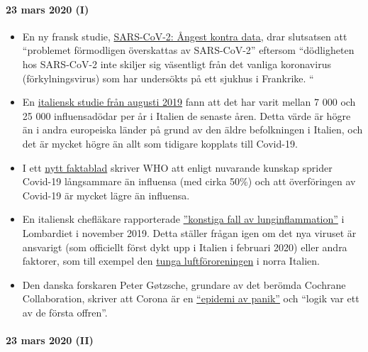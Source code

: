 \hypertarget{23-mars-2020-i}{%
\paragraph{23 mars 2020 (I)}\label{23-mars-2020-i}}

\begin{itemize}
\tightlist
\item
  En ny fransk studie,
  \href{https://www.sciencedirect.com/science/article/abs/pii/S0924857920300972}{SARS-CoV-2:
  Ångest kontra data}, drar slutsatsen att ``problemet förmodligen
  överskattas av SARS-CoV-2'' eftersom ``dödligheten hos SARS-CoV-2 inte
  skiljer sig väsentligt från det vanliga koronavirus (förkylningsvirus)
  som har undersökts på ett sjukhus i Frankrike. ``
\item
  En
  \href{https://www.ijidonline.com/article/S1201-9712(19)30328-5/fulltext}{italiensk
  studie från augusti 2019} fann att det har varit mellan 7 000 och 25
  000 influensadödar per år i Italien de senaste åren. Detta värde är
  högre än i andra europeiska länder på grund av den äldre befolkningen
  i Italien, och det är mycket högre än allt som tidigare kopplats till
  Covid-19.
\item
  I ett
  \href{https://www.who.int/news-room/q-a-detail/q-a-similarities-and-differences-covid-19-and-influenza}{nytt
  faktablad} skriver WHO att enligt nuvarande kunskap sprider Covid-19
  långsammare än influensa (med cirka 50\%) och att överföringen av
  Covid-19 är mycket lägre än influensa.
\item
  En italiensk chefläkare rapporterade
  \href{https://www.scmp.com/news/china/society/article/3076334/coronavirus-strange-pneumonia-seen-lombardy-november-leading}{''konstiga
  fall av lunginflammation''} i Lombardiet i november 2019. Detta
  ställer frågan igen om det nya viruset är ansvarigt (som officiellt
  först dykt upp i Italien i februari 2020) eller andra faktorer, som
  till exempel den
  \href{https://www.thelocal.it/20170131/our-lungs-are-breaking-smog-levels-way-above-safe-limits-in-northern-italy}{tunga
  luftföroreningen} i norra Italien.
\item
  Den danska forskaren Peter Gøtzsche, grundare av det berömda Cochrane
  Collaboration, skriver att Corona är en
  \href{https://www.deadlymedicines.dk/corona-an-epidemic-of-mass-panic/}{``epidemi
  av panik''} och ``logik var ett av de första offren''.
\end{itemize}

\hypertarget{23-mars-2020-ii}{%
\paragraph{23 mars 2020 (II)}\label{23-mars-2020-ii}}

